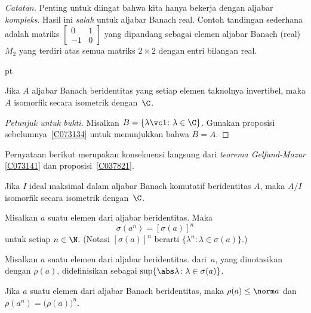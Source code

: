 
\noindent\emph{Catatan.} Penting untuk diingat bahwa kita hanya bekerja dengan aljabar
\emph{kompleks}. Hasil ini \emph{salah} untuk aljabar Banach real. Contoh
tandingan sederhana adalah matriks $\begin{bmatrix}0 & 1 \\ -1 & 0 \end{bmatrix}$ yang dipandang sebagai
elemen aljabar Banach (real) $M_2$ yang terdiri atas semua matriks $2 \times 2$ dengan entri
bilangan real.

  pt

\begin{thm}\label{C073141} Jika $A$ aljabar Banach beridentitas yang setiap
elemen taknolnya invertibel, maka $A$ isomorfik secara isometrik dengan~$\C$.
\end{thm}

\begin{proof}[\emph{Petunjuk untuk bukti}] Misalkan $B = \{ \lambda\vc 1\colon \lambda \in \C\}$. Gunakan
proposisi sebelumnya~\ref{C073134} untuk menunjukkan bahwa $B = A$.    \ns
\end{proof}

Pernyataan berikut merupakan konsekuensi langsung dari \emph{teorema Gelfand-Mazur}
\ref{C073141} dan proposisi~\ref{C037821}.

\begin{cor}\label{C073147} Jika $I$ ideal maksimal dalam aljabar Banach komutatif beridentitas $A$,
maka $A/I$ isomorfik secara isometrik dengan~$\C$.
\end{cor}

\begin{prop}\label{0006703fa} Misalkan $a$ suatu elemen dari aljabar beridentitas. Maka
   \[ \sigma(a^n) = [\sigma(a)]^n \]
untuk setiap $n \in \N$. (Notasi $[\sigma(a)]^n$ berarti $\{\lambda^n\colon \lambda \in
\sigma(a)\}$.)
\end{prop}

\begin{defn}\label{C073154} Misalkan $a$ suatu elemen dari aljabar beridentitas.
 dari~$a$, yang dinotasikan dengan $\rho(a)$, didefinisikan sebagai
$\sup\{\abs\lambda\colon \lambda \in \sigma(a)\}$.
\end{defn}

\begin{prop}\label{0006703} Jika $a$ suatu elemen dari aljabar Banach beridentitas, maka $\rho(a) \le
\norm a$ dan $\rho(a^n) = \bigl(\rho(a)\bigr)^n$.
\end{prop}

